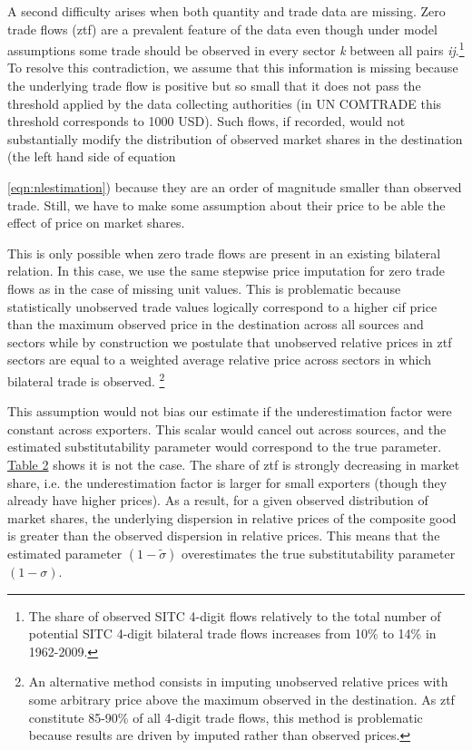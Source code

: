 \documentclass[12pt,twoside,a4paper,notitlepage]{article}
\begin{document}
A second difficulty arises when both quantity and trade data are missing.
Zero trade flows (ztf) are a prevalent feature of the data even though under model assumptions some trade should be observed in every sector \textit{k} between all pairs \textit{ij}.\footnote{The share of observed SITC 4-digit flows relatively to the total number of potential SITC 4-digit bilateral trade flows increases from 10\% to 14\% in 1962-2009.}
To resolve this contradiction, we assume that this information is missing because the underlying trade flow is positive but so small that it does not pass the threshold applied by the data collecting authorities (in UN COMTRADE this threshold corresponds to 1000 USD).
Such flows, if recorded, would not substantially modify the distribution of observed market shares in the destination (the left hand side of equation {\ref{eqn:nlestimation}) because they are an order of magnitude smaller than observed trade.
	Still, we have to make some assumption about their price to be able the effect of price on market shares.
	
	
	This is only possible when zero trade flows are present in an existing bilateral relation.
	In this case, we use the same stepwise price imputation for zero trade flows as in the case of missing unit values.
	This is problematic because statistically unobserved trade values logically correspond to a higher cif price than the maximum observed price in the destination across all sources and sectors while by construction we postulate that unobserved relative prices in ztf sectors are equal to a weighted average relative price across sectors in which bilateral trade is observed.
	\footnote{An alternative method consists in imputing unobserved relative prices with some arbitrary price above the maximum observed in the destination.
		As ztf constitute 85-90\% of all 4-digit trade flows, this method is problematic because results are driven by imputed rather than observed prices.
	}
	
	This assumption would not bias our estimate if the underestimation factor were constant across exporters.
	This scalar would cancel out across sources, and the estimated substitutability parameter would correspond to the true parameter.
	{\hyperref[ref-005]{Table 2}} shows it is not the case.
	The share of ztf is strongly decreasing in market share, i.e.
	the underestimation factor is larger for small exporters (though they already have higher prices).
	As a result, for a given observed distribution of market shares, the underlying dispersion in relative prices of the composite good is greater than the observed dispersion in relative prices.
	This means that the estimated parameter $(1-\tilde{\sigma })$ overestimates the true substitutability parameter $(1-\sigma)$.
	
}
\end{document}
